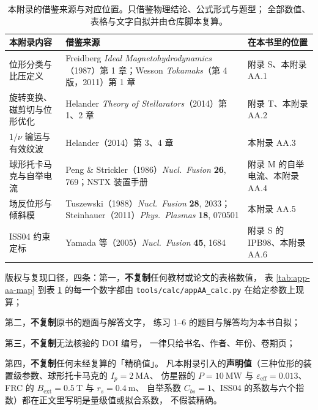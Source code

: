 \begin{table}[htbp]
\centering
\small
\caption{本附录的借鉴来源与对应位置。只借鉴物理结论、公式形式与题型；
全部数值、表格与文字自拟并由仓库脚本复算。}
\label{tab:app-aa-source}
\begin{tabular}{p{3.4cm}p{5.6cm}p{3.6cm}}
\toprule
本附录内容 & 借鉴来源 & 在本书里的位置 \\
\midrule
位形分类与比压定义 &
Freidberg \emph{Ideal Magnetohydrodynamics}（1987）第 1 章；Wesson \emph{Tokamaks}（第 4 版，2011）第 1 章 &
附录 S、本附录 AA.1 \\
旋转变换、磁剪切与位形优化 &
Helander \emph{Theory of Stellarators}（2014）第 1、2 章 &
附录 T、本附录 AA.2 \\
$1/\nu$ 输运与有效纹波 &
Helander（2014）第 3、4 章 &
本附录 AA.3 \\
球形托卡马克与自举电流 &
Peng \& Strickler（1986）\emph{Nucl.\ Fusion} \textbf{26}, 769；NSTX 装置手册 &
附录 M 的自举电流、本附录 AA.4 \\
场反位形与倾斜模 &
Tuszewski（1988）\emph{Nucl.\ Fusion} \textbf{28}, 2033；Steinhauer（2011）\emph{Phys.\ Plasmas} \textbf{18}, 070501 &
本附录 AA.5 \\
ISS04 约束定标 &
Yamada 等（2005）\emph{Nucl.\ Fusion} \textbf{45}, 1684 &
附录 S 的 IPB98、本附录 AA.6 \\
\bottomrule
\end{tabular}

\end{table}

版权与复现口径，四条：第一，\textbf{不复制}任何教材或论文的表格数值，
表 \ref{tab:app-aa-map} 到表 \ref{tab:app-aa-source} 的每一个数字都由
\texttt{tools/\allowbreak{}calc/\allowbreak{}appAA\_calc.py} 在给定参数上现算；

第二，\textbf{不复制}原书的题面与解答文字，
练习 1--6 的题目与解答均为本书自拟；

第三，\textbf{不复制}无法核验的 DOI 编号，
一律只给书名、作者、年份、卷期页；

第四，\textbf{不复制}任何未经复算的「精确值」。
凡本附录引入的\textbf{声明值}（三种位形的装置级参数、球形托卡马克的 $I_p = 2\ \mathrm{MA}$、
仿星器的 $P = 10\ \mathrm{MW}$ 与 $\varepsilon_{\mathrm{eff}} = 0.013$、
FRC 的 $B_{\mathrm{ext}} = 0.5\ \mathrm{T}$ 与 $r_s = 0.4\ \mathrm{m}$、
自举系数 $C_{bs} = 1$、ISS04 的系数与六个指数）都在正文里写明是量级值或拟合系数，
不假装精确。
\endgroup

